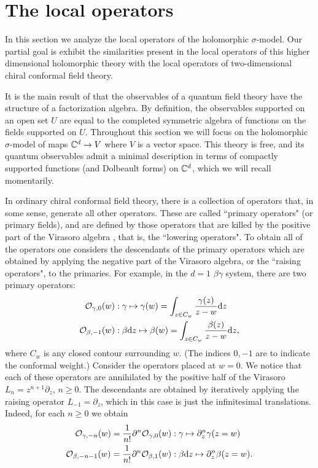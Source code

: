 \documentclass[10pt]{amsart}
\begin{document}
%


\section{The local operators}

In this section we analyze the local operators of the holomorphic $\sigma$-model. 
Our partial goal is exhibit the similarities present in the local operators of this higher dimensional holomorphic theory with the local operators of two-dimensional chiral conformal field theory.

It is the main result of \cite{CG2} that the observables of a quantum field theory have the structure of a factorization algebra.
By definition, the observables supported on an open set $U$ are equal to the completed symmetric algebra of functions on the fields supported on $U$. 
Throughout this section we will focus on the holomorphic $\sigma$-model of maps $\mathbb C^d \to V$ where $V$ is a vector space.
This theory is free, and its quantum observables admit a minimal description in terms of compactly supported functions (and Dolbeault forms) on $\mathbb C^d$, which we will recall momentarily.

In ordinary chiral conformal field theory, there is a collection of operators that, in some sense, generate all other operators. 
These are called ``primary operators" (or primary fields), and are defined by those operators that are killed by the positive part of the Virasoro algebra \cite{polchinski}, that is, the ``lowering operators". 
To obtain all of the operators one considers the descendants of the primary operators which are obtained by applying the negative part of the Virasoro algebra, or the ``raising operators", to the primaries. 
For example, in the $d=1$ $\beta\gamma$ system, there are two primary operators:
\begin{align*}
\mathcal O_{\gamma,0} (w) & : \gamma \mapsto \gamma(w) = \int_{z \in C_w} \frac{\gamma(z)}{z-w} {\rm d} z  \\
\mathcal O_{\beta,-1} (w) & : \beta {\rm d} z \mapsto \beta(w) = \int_{z \in C_w} \frac{\beta(z)}{z-w} {\rm d} z ,
\end{align*}
where $C_w$ is any closed contour surrounding $w$. 
(The indices $0,-1$ are to indicate the conformal weight.)
Consider the operators placed at $w=0$.
We notice that each of these operators are annihilated by the positive half of the Virasoro $L_n = z^{n+1} \partial_z$, $n \geq 0$.
The descendants are obtained by iteratively applying the raising operator $L_{-1} = \partial_z$, which in this case is just the infinitesimal translations. 
Indeed, for each $n \geq 0$ we obtain
\begin{align*}
\mathcal O_{\gamma,-n}(w) = \frac{1}{n!} \partial^n \mathcal O_{\gamma,0}(w) & : \gamma \mapsto \partial_z^n \gamma(z = w) \\
\mathcal O_{\beta,-n-1}(w) = \frac{1}{n!} \partial^n \mathcal O_{\beta,1}(w) & : \beta {\rm d} z \mapsto \partial_z^n \beta(z=w) .
\end{align*}
\end{document}
